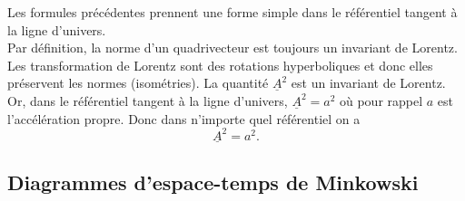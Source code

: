 \documentclass[a4paper,11pt]{report}
\begin{document}
            Les formules précédentes prennent une forme simple dans le référentiel tangent à la ligne d'univers.\\
            
            Par définition, la norme d'un quadrivecteur est toujours un invariant de Lorentz. Les transformation de Lorentz sont des rotations hyperboliques et donc elles préservent les normes (isométries). La quantité $\underline{A}^2$ est un invariant de Lorentz. Or, dans le référentiel tangent à la ligne d'univers, $\underline{A}^2 = a^2$ où pour rappel $a$ est l'accélération propre. Donc dans n'importe quel référentiel on a
            \begin{equation}
                \underline{A}^2 = a^2.
            \end{equation}
        
        \subsection{Diagrammes d'espace-temps de Minkowski}
        
\end{document}
